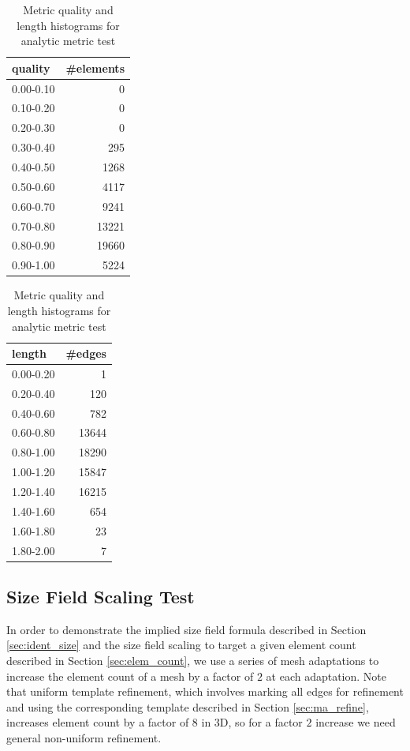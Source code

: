 \begin{table}
\caption{Metric quality and length histograms for analytic metric test}
\label{tab:ugawg}
\begin{center}
\begin{tabular}{l|r}
quality & \#elements \\ \hline
0.00-0.10 & 0 \\
0.10-0.20 & 0 \\
0.20-0.30 & 0 \\
0.30-0.40 & 295 \\
0.40-0.50 & 1268 \\
0.50-0.60 & 4117 \\
0.60-0.70 & 9241 \\
0.70-0.80 & 13221 \\
0.80-0.90 & 19660 \\
0.90-1.00 & 5224 \\
\end{tabular}
\quad\quad
\begin{tabular}{l|r}
length & \#edges \\ \hline
0.00-0.20 & 1 \\
0.20-0.40 & 120 \\
0.40-0.60 & 782 \\
0.60-0.80 & 13644 \\
0.80-1.00 & 18290 \\
1.00-1.20 & 15847 \\
1.20-1.40 & 16215 \\
1.40-1.60 & 654 \\
1.60-1.80 & 23 \\
1.80-2.00 & 7 \\
\end{tabular}
\end{center}
\end{table}

\subsection{Size Field Scaling Test}
\label{sec:scale_test}

In order to demonstrate the implied size field
formula described in Section \ref{sec:ident_size} and the
size field scaling to target a given element count
described in Section \ref{sec:elem_count}, we use
a series of mesh adaptations to increase the element
count of a mesh by a factor of $2$ at each adaptation.
Note that uniform template refinement, which involves
marking all edges for refinement and using the corresponding
template described in Section \ref{sec:ma_refine}, increases
element count by a factor of $8$ in 3D, so for a factor $2$
increase we need general non-uniform refinement.

